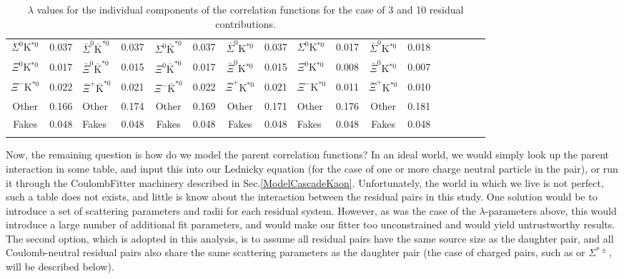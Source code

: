 \documentclass[/home/jesse/Analysis/FemtoAnalysis/AnalysisNotes/AnalysisNoteJBuxton.tex]{subfiles}
\begin{document}
\begin{landscape}
\begin{table}[htbp]
{\begin{tabular}{|c|cV{5.0}c|cV{5.0}c|cV{5.0}c|cV{5.0}c|cV{5.0}c|c|}
  $\Sigma^{0}$K$^{*0}$ & 0.037 & $\bar{\Sigma}^{0}\bar{\mathrm{K}}^{*0}$ & 0.037 & $\Sigma^{0}\bar{\mathrm{K}}^{*0}$ & 0.037 & $\bar{\Sigma}^{0}$K$^{*0}$ & 0.037 & $\Sigma^{0}$K$^{*0}$ & 0.017 & $\bar{\Sigma}^{0}$K$^{*0}$ & 0.018 \\
  
  $\Xi^{0}$K$^{*0}$ & 0.017 & $\bar{\Xi}^{0}\bar{\mathrm{K}}^{*0}$ & 0.015 & $\Xi^{0}\bar{\mathrm{K}}^{*0}$ & 0.017 & $\bar{\Xi}^{0}$K$^{*0}$ & 0.015 & $\Xi^{0}$K$^{*0}$ & 0.008 & $\bar{\Xi}^{0}$K$^{*0}$ & 0.007 \\
  
  $\Xi^{-}$K$^{*0}$ & 0.022 & $\bar{\Xi}^{+}\bar{\mathrm{K}}^{*0}$ & 0.021 & $\Xi^{-}\bar{\mathrm{K}}^{*0}$ & 0.022 & $\bar{\Xi}^{+}$K$^{*0}$ & 0.021 & $\Xi^{-}$K$^{*0}$ & 0.011 & $\bar{\Xi}^{+}$K$^{*0}$ & 0.010 \\
  
  Other & 0.166 & Other & 0.174 & Other & 0.169 & Other & 0.171 & Other & 0.176 & Other & 0.181 \\
  
  Fakes & 0.048 & Fakes & 0.048 & Fakes & 0.048 & Fakes & 0.048 & Fakes & 0.048 & Fakes & 0.048 \\
  
 \end{tabular}}
 \caption{$\lambda$ values for the individual components of the \LamK correlation functions for the case of 3 and 10 residual contributions.}
 \label{tab:LambdaValues_All}
\end{table}

\end{landscape}
\pagestyle{plain}





Now, the remaining question is how do we model the parent correlation functions?  In an ideal world, we would simply look up the parent interaction in some table, and input this into our Lednicky equation (for the case of one or more charge neutral particle in the pair), or run it through the CoulombFitter machinery described in Sec.\ref{ModelCascadeKaon}.  Unfortunately, the world in which we live is not perfect, such a table does not exists, and little is know about the interaction between the residual pairs in this study.  One solution would be to introduce a set of scattering parameters and radii for each residual system.  However, as was the case of the $\lambda$-parameters above, this would introduce a large number of additional fit parameters, and would make our fitter too unconstrained and would yield untrustworthy results.  The second option, which is adopted in this analysis, is to assume all residual pairs have the same source size as the daughter pair, and all Coulomb-neutral residual pairs also share the same scattering parameters as the daughter pair (the case of charged pairs, such as \XiKpm or $\Sigma^{*\pm}$\Kpm, will be described below).
\end{document}
